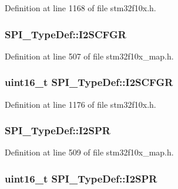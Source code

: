 Definition at line 1168 of file stm32f10x.\+h.

\subsubsection[{\texorpdfstring{I2\+S\+C\+F\+GR}{I2SCFGR}}]{ S\+P\+I\+\_\+\+Type\+Def\+::\+I2\+S\+C\+F\+GR}\hypertarget{struct_s_p_i___type_def_a41360ca08cd2ee2f8bc82e10b2dd5db1}{}\label{struct_s_p_i___type_def_a41360ca08cd2ee2f8bc82e10b2dd5db1}


Definition at line 507 of file stm32f10x\+\_\+map.\+h.

\subsubsection[{\texorpdfstring{I2\+S\+C\+F\+GR}{I2SCFGR}}]{ {\bf uint16\+\_\+t} S\+P\+I\+\_\+\+Type\+Def\+::\+I2\+S\+C\+F\+GR}\hypertarget{struct_s_p_i___type_def_a20a4775ce461eec0d9a437bed464c0a5}{}\label{struct_s_p_i___type_def_a20a4775ce461eec0d9a437bed464c0a5}


Definition at line 1176 of file stm32f10x.\+h.

\subsubsection[{\texorpdfstring{I2\+S\+PR}{I2SPR}}]{ S\+P\+I\+\_\+\+Type\+Def\+::\+I2\+S\+PR}\hypertarget{struct_s_p_i___type_def_a6e5cd2626a323ac05f319a933e73c7d2}{}\label{struct_s_p_i___type_def_a6e5cd2626a323ac05f319a933e73c7d2}


Definition at line 509 of file stm32f10x\+\_\+map.\+h.

\subsubsection[{\texorpdfstring{I2\+S\+PR}{I2SPR}}]{ {\bf uint16\+\_\+t} S\+P\+I\+\_\+\+Type\+Def\+::\+I2\+S\+PR}\hypertarget{struct_s_p_i___type_def_aecee11b0d2e534b5243e9db6a0e10026}{}\label{struct_s_p_i___type_def_aecee11b0d2e534b5243e9db6a0e10026}



